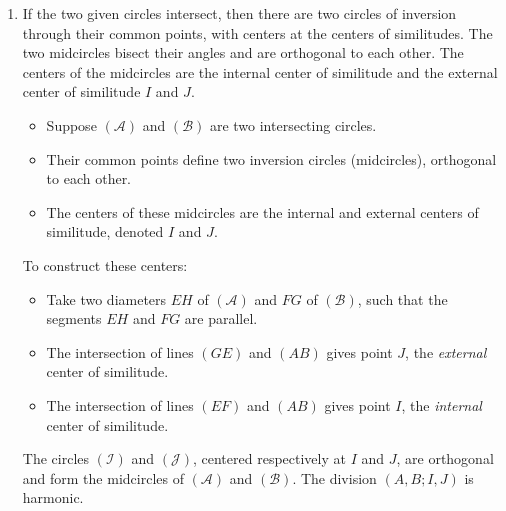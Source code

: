\begin{enumerate}[label=(\roman*)]
\item If the two given circles intersect, then there are two  circles of inversion through their common points, with centers at the centers of similitudes.  The two midcircles bisect their angles and are orthogonal to each other. The centers of the midcircles are the internal center of similitude and the external center of similitude $I$ and $J$.

\begin{itemize}
  \item Suppose $(\mathcal{A})$ and $(\mathcal{B})$ are two intersecting circles.
  \item Their common points define two inversion circles (midcircles), orthogonal to each other.
  \item The centers of these midcircles are the internal and external centers of similitude, denoted $I$ and $J$.
\end{itemize}


To construct these centers:
\begin{itemize}
  \item Take two diameters $EH$ of $(\mathcal{A})$ and $FG$ of $(\mathcal{B})$, such that the segments $EH$ and $FG$ are parallel.
  \item The intersection of lines $(GE)$ and $(AB)$ gives point $J$, the \emph{external} center of similitude.
  \item The intersection of lines $(EF)$ and $(AB)$ gives point $I$, the \emph{internal} center of similitude.
\end{itemize}


The circles $(\mathcal{I})$ and $(\mathcal{J})$, centered respectively at $I$ and $J$, are orthogonal and form the midcircles of $(\mathcal{A})$ and $(\mathcal{B})$. The division $(A,B;I,J)$ is harmonic.

\vspace{1em}


\end{enumerate}
